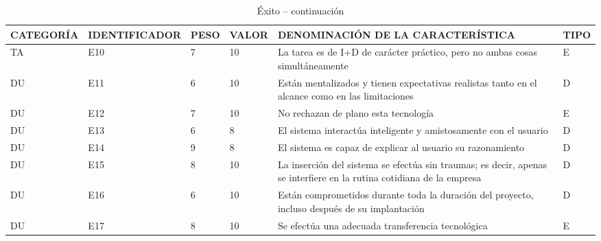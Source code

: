\documentclass[a4paper,12pt]{article}
\begin{document}
\begin{table}[h]
	\centering
	\begin{tabular}{|l|l|l|l|p{4cm}|l|}
		\hline
		\scriptsize CATEGORÍA & \scriptsize IDENTIFICADOR & \scriptsize PESO & \scriptsize VALOR & \scriptsize DENOMINACIÓN DE LA CARACTERÍSTICA                                                                        & \scriptsize TIPO \\ \hline
		TA                    & E10                       & 7                & 10                & La tarea es de I+D de carácter práctico, pero no ambas cosas simultáneamente                                         & E                \\ \hline
		DU                    & E11                       & 6                & 10                & Están mentalizados y tienen expectativas realistas tanto en el alcance como en las limitaciones                      & D                \\ \hline
		DU                    & E12                       & 7                & 10                & No rechazan de plano esta tecnología                                                                                 & E                \\ \hline
		DU                    & E13                       & 6                & 8                 & El sistema interactúa inteligente y amistosamente con el usuario                                                     & D                \\ \hline
		DU                    & E14                       & 9                & 8                 & El sistema es capaz de explicar al usuario su razonamiento                                                           & D                \\ \hline
		DU                    & E15                       & 8                & 10                & La inserción del sistema se efectúa sin traumas; es decir, apenas se interfiere en la rutina cotidiana de la empresa & D                \\ \hline
		DU                    & E16                       & 6                & 10                & Están comprometidos durante toda la duración del proyecto, incluso después de su implantación                        & D                \\ \hline
		DU                    & E17                       & 8                & 10                & Se efectúa una adecuada transferencia tecnológica                                                                    & E                \\ \hline
	\end{tabular}
\caption{Éxito -- continuación}
\label{tab:exito2}
\end{table}

\end{document}
